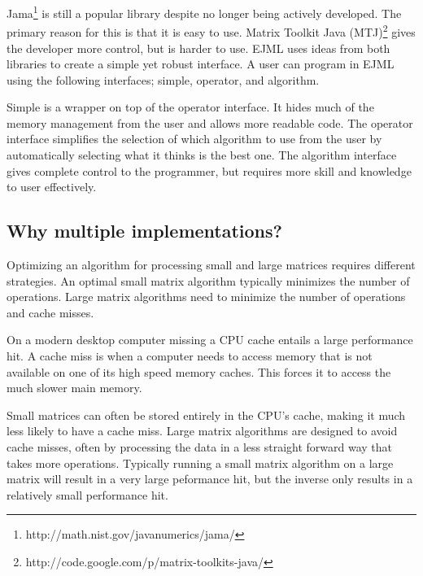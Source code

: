 \documentclass[12pt]{article}%
\begin{document}
Jama\footnote{http://math.nist.gov/javanumerics/jama/} is still a popular library despite no longer being actively developed.  The primary reason for this is that it is easy to use.  Matrix Toolkit Java (MTJ)\footnote{http://code.google.com/p/matrix-toolkits-java/} gives the developer more control, but is harder to use.  EJML uses ideas from both libraries to create a simple yet robust interface.  A user can program in EJML using the following interfaces; simple, operator, and algorithm. 

Simple is a wrapper on top of the operator interface.  It hides much of the memory management from the user and allows more readable code. The operator interface simplifies the selection of which algorithm to use from the user by automatically selecting what it thinks is the best one.  The algorithm interface gives complete control to the programmer, but requires more skill and knowledge to user effectively.

\subsection{Why multiple implementations?}
Optimizing an algorithm for processing small and large matrices requires different strategies.  An optimal small matrix algorithm typically minimizes the number of operations.  Large matrix algorithms need to minimize the number of operations and cache misses.

On a modern desktop computer missing a CPU cache entails a large performance hit.  A cache miss is when a computer needs to access memory that is not available on one of its high speed memory caches.  This forces it to access the much slower main memory.

Small matrices can often be stored entirely in the CPU's cache, making it much less likely to have a cache miss.  Large matrix algorithms are designed to avoid cache misses, often by processing the data in a less straight forward way that takes more operations.  Typically running a small matrix algorithm on a large matrix will result in a very large peformance hit, but the inverse only results in a relatively small performance hit.
\end{document}
